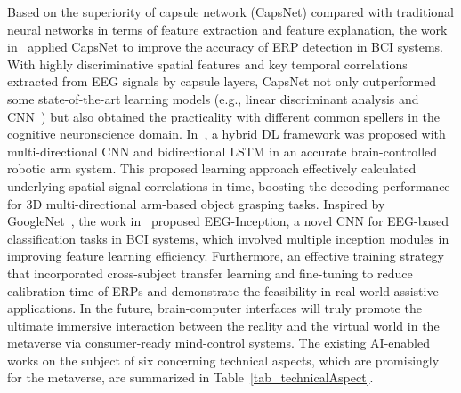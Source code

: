 \documentclass[journal]{IEEEtran}
\begin{document}
Based on the superiority of capsule network (CapsNet) compared with traditional neural networks in terms of feature extraction and feature explanation, the work in~\cite{ma2021capsule} applied CapsNet to improve the accuracy of ERP detection in BCI systems. With highly discriminative spatial features and key temporal correlations extracted from EEG signals by capsule layers, CapsNet not only outperformed some state-of-the-art learning models (e.g., linear discriminant analysis and CNN~\cite{sakhavi2018learning}) but also obtained the practicality with different common spellers in the cognitive neuronscience domain.
In~\cite{jeong2020brain}, a hybrid DL framework was proposed with multi-directional CNN and bidirectional LSTM in an accurate brain-controlled robotic arm system. This proposed learning approach effectively calculated underlying spatial signal correlations in time, boosting the decoding performance for 3D multi-directional arm-based object grasping tasks.
Inspired by GoogleNet~\cite{szegedy2015going}, the work in~\cite{santamaria2020eeg} proposed EEG-Inception, a novel CNN for EEG-based classification tasks in BCI systems, which involved multiple inception modules in improving feature learning efficiency. Furthermore, an effective training strategy that incorporated cross-subject transfer learning and fine-tuning to reduce calibration time of ERPs and demonstrate the feasibility in real-world assistive applications.
In the future, brain-computer interfaces will truly promote the ultimate immersive interaction between the reality and the virtual world in the metaverse via consumer-ready mind-control systems.
The existing AI-enabled works on the subject of six concerning technical aspects, which are promisingly for the metaverse, are summarized in Table~\ref{tab_technicalAspect}.
\end{document}
